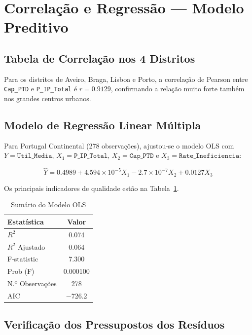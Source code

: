 \documentclass[conference]{IEEEtran}
\begin{document}
\section{Correlação e Regressão --- Modelo Preditivo}

\subsection{Tabela de Correlação nos 4 Distritos}

Para os distritos de Aveiro, Braga, Lisboa e Porto, a correlação de Pearson entre \texttt{Cap\_PTD} e \texttt{P\_IP\_Total} é $r = 0.9129$, confirmando a relação muito forte também nos grandes centros urbanos.

\subsection{Modelo de Regressão Linear Múltipla}

Para Portugal Continental (278 observações), ajustou-se o modelo OLS com $Y = \texttt{Util\_Media}$, $X_1 = \texttt{P\_IP\_Total}$, $X_2 = \texttt{Cap\_PTD}$ e $X_3 = \texttt{Rate\_Ineficiencia}$:

\begin{equation}
\hat{Y} = 0.4989 + 4.594 \!\times\! 10^{-5} X_1 - 2.7 \!\times\! 10^{-7} X_2 + 0.0127 X_3
\label{eq:modelo}
\end{equation}

Os principais indicadores de qualidade estão na Tabela~\ref{tab:ols}.

\begin{table}[htbp]
\caption{Sumário do Modelo OLS}
\label{tab:ols}
\centering
\begin{tabular}{lc}
\hline
\textbf{Estatística}  & \textbf{Valor}  \\
\hline
$R^2$                 & 0.074           \\
$R^2$ Ajustado        & 0.064           \\
F-statistic           & 7.300           \\
Prob (F)              & 0.000100        \\
N.º Observações       & 278             \\
AIC                   & $-$726.2        \\
\hline
\end{tabular}
\end{table}

\subsection{Verificação dos Pressupostos dos Resíduos}
\end{document}

